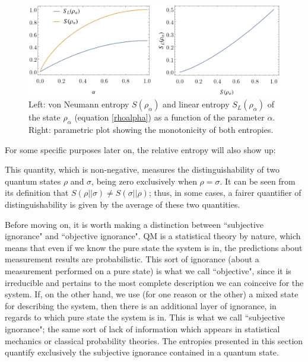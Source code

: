 \documentclass[12pt,a4paper,notitlepage]{report}
\begin{document}
\begin{figure}[t]
  \centering
  \includegraphics[width=.85\textwidth]{../Figuras/entropias.eps}
  \captionsetup{font=footnotesize, margin=8pt}
  \caption{Left: von Neumann entropy $S(\rho_\alpha)$ and linear entropy $S_L(\rho_\alpha)$ of the state $\rho_\alpha$ (equation \eqref{rhoalpha}) as a function of the parameter $\alpha$. Right: parametric plot showing the monotonicity of both entropies.}
  \label{entropy-graph}
\end{figure}

For some specific purposes later on, the relative entropy will also show up:

%
This quantity, which is non-negative, measures the distinguishability of two quantum states $\rho$ and $\sigma$, being zero exclusively when $\rho = \sigma$. It can be seen from its definition that $S(\rho || \sigma) \neq S(\sigma || \rho)$; thus, in some cases, a fairer quantifier of distinguishability is given by the average of these two quantities.


Before moving on, it is worth making a distinction between ``subjective ignorance" and ``objective ignorance". QM is a statistical theory by nature, which means that even if we know the pure state the system is in, the predictions about measurement results are probabilistic. This sort of ignorance (about a measurement performed on a pure state) is what we call ``objective", since it is irreducible and pertains to the most complete description we can coinceive for the system. If, on the other hand, we use (for one reason or the other) a mixed state for describing the system, then there is an additional layer of ignorance, in regards to which pure state the system is in. This is what we call ``subjective ignorance"; the same sort of lack of information which appears in statistical mechanics or classical probability theories. The entropies presented in this section quantify exclusively the subjective ignorance contained in a quantum state.
\end{document}
